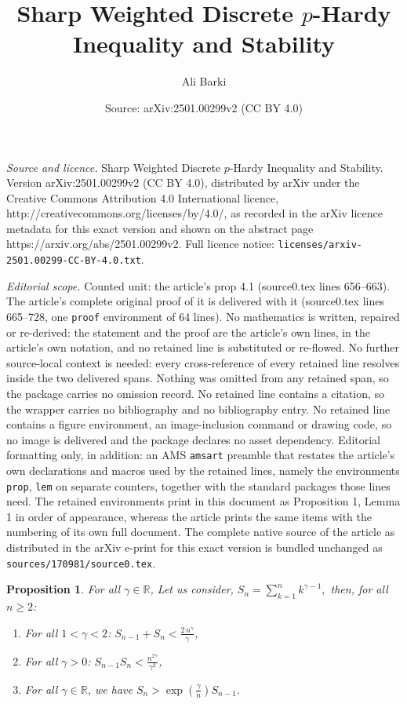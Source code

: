 \documentclass[10pt,a4paper]{amsart}
\title{\small Sharp Weighted Discrete $p$-Hardy Inequality and Stability}
\author{Ali Barki}
\date{Source: arXiv:2501.00299v2 (CC BY 4.0)}
\newtheorem{prop}{Proposition}
\begin{document}
\maketitle

\noindent\emph{Source and licence.} \small Sharp Weighted Discrete $p$-Hardy Inequality and Stability. Version arXiv:2501.00299v2 (CC BY 4.0), distributed by arXiv under the Creative Commons Attribution 4.0 International licence, http://creativecommons.org/licenses/by/4.0/, as recorded in the arXiv licence metadata for this exact version and shown on the abstract page https://arxiv.org/abs/2501.00299v2. Full licence notice: \texttt{licenses/arxiv-2501.00299-CC-BY-4.0.txt}.\par\smallskip

\noindent\textit{Editorial scope.} Counted unit: the article's prop 4.1 (source0.tex lines 656--663). The article's complete original proof of it is delivered with it (source0.tex lines 665--728, one \texttt{proof} environment of 64 lines). No mathematics is written, repaired or re-derived: the statement and the proof are the article's own lines, in the article's own notation, and no retained line is substituted or re-flowed.  No further source-local context is needed: every cross-reference of every retained line resolves inside the two delivered spans.  Nothing was omitted from any retained span, so the package carries no omission record.  No retained line contains a citation, so the wrapper carries no bibliography and no bibliography entry.  No retained line contains a figure environment, an image-inclusion command or drawing code, so no image is delivered and the package declares no asset dependency.  Editorial formatting only, in addition: an AMS \texttt{amsart} preamble that restates the article's own declarations and macros used by the retained lines, namely the environments \texttt{prop}, \texttt{lem} on separate counters, together with the standard packages those lines need.  The retained environments print in this document as Proposition 1, Lemma 1 in order of appearance, whereas the article prints the same items with the numbering of its own full document.  The complete native source of the article as distributed in the arXiv e-print for this exact version is bundled unchanged as \texttt{sources/170981/source0.tex}.
\begin{prop} \label{prop 4.1} For all $\gamma \in \mathbb{R}$, Let us consider, $\displaystyle S_n = \sum_{k=1}^n k^{\gamma - 1},
$ then, for all $n \geq 2$:
\begin{enumerate}
    \item[\textit{ i)}] For all  $1 < \gamma < 2$: $S_{n-1} + S_n < \frac{2 \, n^{\gamma}}{\gamma}$,
    \item[\textit{ ii)}] For all $\gamma > 0$: $S_{n-1} S_n < \frac{n^{2 \gamma}}{\gamma^2}$,
    \item[\textit{iii)}] For all  $\gamma \in \mathbb{R}$, we have $S_n > \exp\left(\frac{\gamma}{n}\right) S_{n-1}$.
\end{enumerate}
\end{prop}
\end{document}

